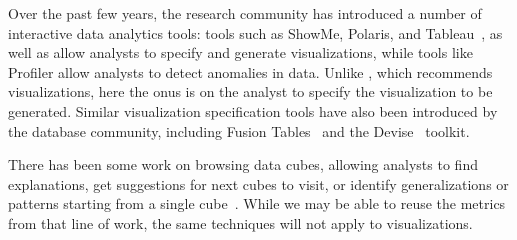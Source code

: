 

Over the past few years, the research community has introduced 
a number of interactive data analytics tools: 
tools such as ShowMe, Polaris, and Tableau~\cite{DBLP:journals/cacm/StolteTH08,
  DBLP:journals/tvcg/MackinlayHS07}, as well as  allow analysts to specify and
  generate visualizations, while tools like Profiler
  allow analysts to detect anomalies in data.
Unlike \SeeDB, which recommends visualizations, here the onus is on
the analyst to specify the visualization to be generated.
Similar visualization specification tools have also been introduced
by the database community, including Fusion Tables~\cite{DBLP:conf/sigmod/GonzalezHJLMSSG10} 
and the Devise~\cite{DBLP:conf/sigmod/LivnyRBCDLMW97} toolkit.

There has been some work on browsing data cubes, allowing
analysts to find explanations, get suggestions for next cubes to visit,
or identify generalizations or patterns starting from a single cube~\cite{DBLP:conf/vldb/Sarawagi99, 
DBLP:conf/vldb/SatheS01, DBLP:conf/vldb/Sarawagi00}. 
While we may be able to reuse the metrics from that line of work,
the same techniques will not apply to visualizations.



